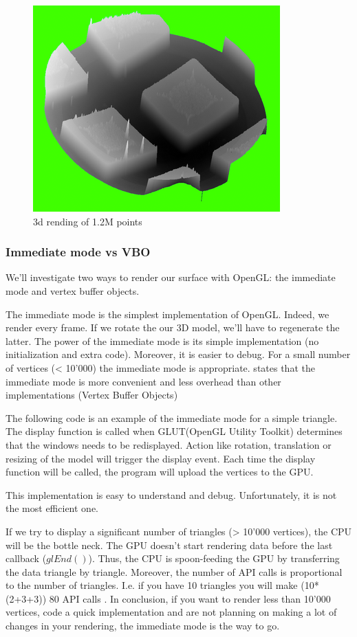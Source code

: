 \begin{figure}[H]
  \centering
  \includegraphics[scale=0.8]{images/3drendering.png}
    \caption{3d rending of 1.2M points}
  \label{rendering3d}
\end{figure}

\subsubsection{Immediate mode vs VBO}

We'll investigate two ways to render our surface with OpenGL: the immediate mode and vertex buffer objects.

The immediate mode is the simplest implementation of OpenGL. Indeed, we render  every frame. If we rotate the our 3D model, we'll have to regenerate the latter. The power of the immediate mode is its simple implementation (no initialization and extra code). Moreover, it is easier to debug. For a small number of vertices (< 10'000) the immediate mode is appropriate. \cite{opengl1} states that the immediate mode is more convenient and less overhead than other implementations (Vertex Buffer Objects)

The following code is an example of the immediate mode for a simple triangle. The display function is called when GLUT(OpenGL Utility Toolkit) determines that the windows needs to be redisplayed. Action like rotation, translation or resizing of the model will trigger the display event. Each time the display function will be called, the program will upload the vertices to the GPU.

This implementation is easy to understand and debug. Unfortunately, it is not the most efficient one. 

If we try to display a significant number of triangles (> 10'000 vertices), the CPU will be the bottle neck. The GPU doesn't start rendering data before the last callback ($glEnd()$). Thus, the CPU is spoon-feeding the GPU by transferring the data triangle by triangle. Moreover, the number of API calls is proportional to the number of triangles. I.e. if you have 10 triangles you will make (10*(2+3+3)) 80 API calls \cite{opengllegacy}. In conclusion, if you want to render less than 10'000 vertices, code a quick implementation and are not planning on making a lot of changes in your rendering, the immediate mode is the way to go.


